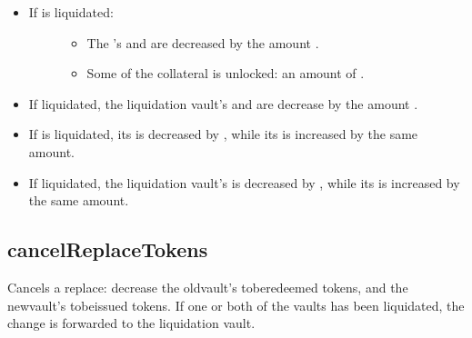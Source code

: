 \documentclass[a4paper,10pt,english]{sphinxmanual}
\begin{document}
\begin{itemize}
\item {} \begin{description}
\item[{If  is  liquidated:}] \leavevmode\begin{itemize}
\item {} 
The ’s  and  are decreased by the amount .

\item {} 
Some of the  collateral is unlocked: an amount of .

\end{itemize}

\end{description}

\item {} 
If   liquidated, the liquidation vault’s  and  are decrease by the amount .

\item {} 
If  is  liquidated, its  is decreased by , while its  is increased by the same amount.

\item {} 
If   liquidated, the liquidation vault’s   is decreased by , while its  is increased by the same amount.

\end{itemize}


\subsection{cancelReplaceTokens}
\label{\detokenize{spec/vault-registry:cancelreplacetokens}}\label{\detokenize{spec/vault-registry:id35}}
Cancels a replace: decrease the old\sphinxhyphen{}vault’s to\sphinxhyphen{}be\sphinxhyphen{}redeemed tokens, and the new\sphinxhyphen{}vault’s to\sphinxhyphen{}be\sphinxhyphen{}issued tokens. If one or both of the vaults has been liquidated, the change is forwarded to the liquidation vault.
\end{document}
